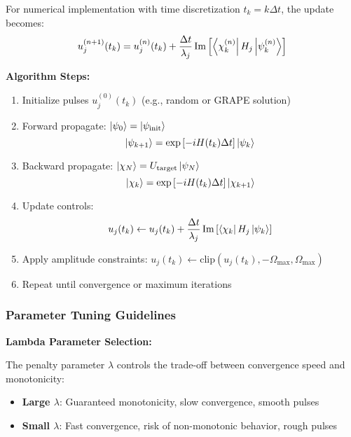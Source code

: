 \documentclass[11pt,a4paper]{article}
\theoremstyle{definition}
\theoremstyle{remark}
\begin{document}
For numerical implementation with time discretization $t_k = k\Delta t$, the update becomes:
\begin{equation}
u_j^{(n+1)}(t_k) = u_j^{(n)}(t_k) + \frac{\Delta t}{\lambda_j}\Im\left[\bra{\chi^{(n)}_k} H_j \ket{\psi^{(n)}_k}\right]
\end{equation}

\textbf{Algorithm Steps:}
\begin{enumerate}
    \item Initialize pulses $u_j^{(0)}(t_k)$ (e.g., random or GRAPE solution)
    \item Forward propagate: $\ket{\psi_0} = \ket{\psi_{\text{init}}}$
    \begin{equation}
    \ket{\psi_{k+1}} = \exp\left[-i H(t_k)\Delta t\right]\ket{\psi_k}
    \end{equation}
    \item Backward propagate: $\ket{\chi_N} = U_{\text{target}}\ket{\psi_N}$
    \begin{equation}
    \ket{\chi_k} = \exp\left[-i H(t_k)\Delta t\right]\ket{\chi_{k+1}}
    \end{equation}
    \item Update controls:
    \begin{equation}
    u_j(t_k) \leftarrow u_j(t_k) + \frac{\Delta t}{\lambda_j}\Im\left[\bra{\chi_k} H_j \ket{\psi_k}\right]
    \end{equation}
    \item Apply amplitude constraints: $u_j(t_k) \leftarrow \text{clip}(u_j(t_k), -\Omega_{\max}, \Omega_{\max})$
    \item Repeat until convergence or maximum iterations
\end{enumerate}

\subsubsection{Parameter Tuning Guidelines}

\textbf{Lambda Parameter Selection:}

The penalty parameter $\lambda$ controls the trade-off between convergence speed and monotonicity:
\begin{itemize}
    \item \textbf{Large $\lambda$}: Guaranteed monotonicity, slow convergence, smooth pulses
    \item \textbf{Small $\lambda$}: Fast convergence, risk of non-monotonic behavior, rough pulses
\end{itemize}
\end{document}
